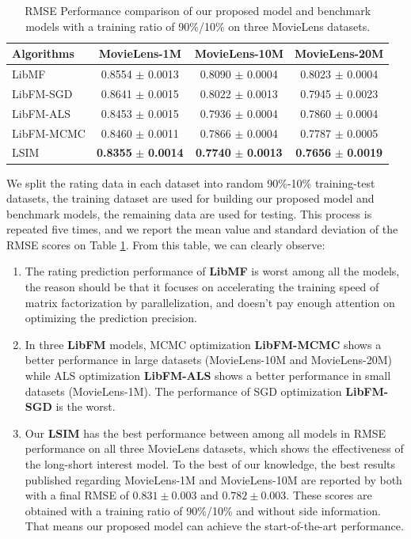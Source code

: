\documentclass{llncs}
\begin{document}
\begin{table}[htbp]
	\centering
	\caption{RMSE Performance comparison of our proposed model and benchmark models
		with a training ratio of 90\%/10\% on three MovieLens datasets.}
	\label{tab:msre}
	\begin{tabular}{|l|c|c|c|}
		\hline
		\textbf{Algorithms} & \textbf{MovieLens-1M} & \textbf{MovieLens-10M} & \textbf{MovieLens-20M} \\
		\hline
		LibMF      & 0.8554 $\pm$ 0.0013 & 0.8090 $\pm$ 0.0004 & 0.8023 $\pm$ 0.0004 \\
		LibFM-SGD  & 0.8641 $\pm$ 0.0015 & 0.8022 $\pm$ 0.0013 & 0.7945 $\pm$ 0.0023 \\
		LibFM-ALS  & 0.8453 $\pm$ 0.0015 & 0.7936 $\pm$ 0.0004 & 0.7860 $\pm$ 0.0004 \\
		LibFM-MCMC & 0.8460 $\pm$ 0.0011 & 0.7866 $\pm$ 0.0004 & 0.7787 $\pm$ 0.0005 \\
		LSIM       & \textbf{0.8355} $\pm$ \textbf{0.0014} & \textbf{0.7740} $\pm$ \textbf{0.0013} & \textbf{0.7656} $\pm$ \textbf{0.0019} \\
		\hline
	\end{tabular}
\end{table}

We split the rating data in each dataset into random 90\%-10\% training-test
datasets, the training dataset are used for building our proposed model
and benchmark models, the remaining data are used for testing.
This process is repeated five times, and we report the mean value and
standard deviation of the RMSE scores on Table \ref{tab:msre}.
From this table, we can clearly observe:
\begin{enumerate}
	\item The rating prediction performance of \textbf{LibMF} is worst among all the models,
	the reason should be that it focuses on accelerating the training speed of matrix
	factorization by parallelization, and doesn't pay enough attention on optimizing
	the prediction precision.
	\item In three \textbf{LibFM} models, MCMC optimization \textbf{LibFM-MCMC} shows
	a better performance in large datasets (MovieLens-10M and MovieLens-20M) while
	ALS optimization \textbf{LibFM-ALS} shows a better performance in small datasets
	(MovieLens-1M). The performance of SGD optimization \textbf{LibFM-SGD} is the worst.
	\item Our \textbf{LSIM} has the best performance between among all models in RMSE
	performance on all three MovieLens datasets, which shows the effectiveness
	of the long-short interest model. To the best of our knowledge, the best results
	published regarding MovieLens-1M and MovieLens-10M are reported by both
	\cite{lee2013local}\cite{sedhain2015autorec} with a final RMSE of $0.831 \pm 0.003$
	and $0.782 \pm 0.003$. These scores are obtained with a training ratio of
	90\%/10\% and without side information. That means our proposed model can achieve
	the start-of-the-art performance.
\end{enumerate}
\end{document}
